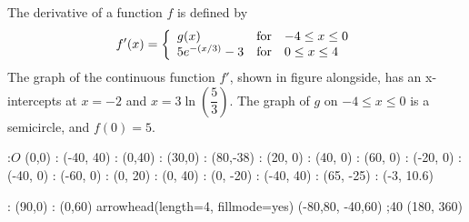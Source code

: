 

\question The derivative of a function $f$ is defined by 
\begin{align}
  f'(x) = \left\{
            \begin{array}{l l l}
              g(x)           & \text{for} & -4 \leq x \leq 0 \\
              5 e^{-(x/3)}-3 & \text{for} & 0 \leq x \leq 4  \\
            \end{array} 
          \right. \nonumber 
\end{align}
The graph of the continuous function $f'$, shown in figure alongside, has an x-intercepts at $x=-2$ and $x=3\ln (\dfrac{5}{3})$. The graph of $g$ on $-4 \leq x \leq 0$ is a semicircle, and $f(0)=5$.

\begin{marginfigure}
:$O$ (0,0)
: (-40, 40) 
: (0,40)
: (30,0)
: (80,-38)
: (20, 0)
: (40, 0)
: (60, 0)
: (-20, 0)
: (-40, 0)
: (-60, 0)
: (0, 20)
: (0, 40)
: (0, -20)
: (-40, 40)
: (65, -25)
: (-3, 10.6)

: (90,0)
: (0,60)
\figdrawbegin{}
\figset arrowhead(length=4, fillmode=yes) %
(-80,80, -40,60)
;40 (180, 360)
\figdrawcurve [15,1,2,14,3]
\figdrawend
{}
\centerline{\box\figBoxA}
\end{marginfigure}


\ifprintanswers
\fi 

